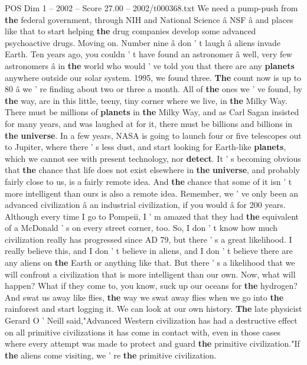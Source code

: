 \begin{textsample}{POS Dim 1 – 2002 – Score 27.00 – 2002/t000368.txt}
We need a pump-push from \textbf{the} federal government, through NIH and National Science â NSF â and places like that to start helping \textbf{the} drug companies develop some advanced psychoactive drugs.
Moving on.
Number nine â don ' t laugh â aliens invade Earth.
Ten years ago, you couldn ' t have found an astronomer â well, very few astronomers â in \textbf{the} world who would ' ve told you that there are any \textbf{planets} anywhere outside our solar system. 1995, we found three. \textbf{The} count now is up to 80 â we ' re finding about two or three a month.
All of \textbf{the} ones we ' ve found, by \textbf{the} way, are in this little, teeny, tiny corner where we live, in \textbf{the} Milky Way.
There must be millions of \textbf{planets} in \textbf{the} Milky Way, and as Carl Sagan insisted for many years, and was laughed at for it, there must be billions and billions in \textbf{the} \textbf{universe}.
In a few years, NASA is going to launch four or five telescopes out to Jupiter, where there ' s less dust, and start looking for Earth-like \textbf{planets}, which we cannot see with present technology, nor \textbf{detect}.
It ' s becoming obvious that \textbf{the} chance that life does not exist elsewhere in \textbf{the} \textbf{universe}, and probably fairly close to us, is a fairly remote idea.
And \textbf{the} chance that some of it isn ' t more intelligent than ours is also a remote idea.
Remember, we ' ve only been an advanced civilization â an industrial civilization, if you would â for 200 years.
Although every time I go to Pompeii, I ' m amazed that they had \textbf{the} equivalent of a McDonald ' s on every street corner, too.
So, I don ' t know how much civilization really has progressed since AD 79, but there ' s a great likelihood.
I really believe this, and I don ' t believe in aliens, and I don ' t believe there are any aliens on \textbf{the} Earth or anything like that.
But there ' s a likelihood that we will confront a civilization that is more intelligent than our own.
Now, what will happen?
What if they come to, you know, suck up our oceans for \textbf{the} hydrogen?
And swat us away like flies, \textbf{the} way we swat away flies when we go into \textbf{the} rainforest and start logging it.
We can look at our own history. \textbf{The} late physicist Gerard O ' Neill said,"Advanced Western civilization has had a destructive effect on all primitive civilizations it has come in contact with, even in those cases where every attempt was made to protect and guard \textbf{the} primitive civilization."If \textbf{the} aliens come visiting, we ' re \textbf{the} primitive civilization.

\end{textsample}

